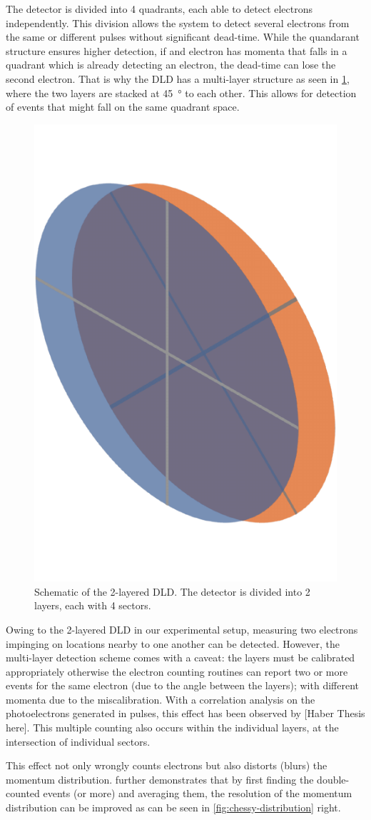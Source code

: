 The detector is divided into \num{4} quadrants, each able to detect electrons independently. This division allows the system to detect several electrons from the same or different pulses without significant dead-time. While the quandarant structure ensures higher detection, if and electron has momenta that falls in a quadrant which is already detecting an electron, the dead-time can lose the second electron. That is why the \gls{DLD} has a multi-layer structure as seen in \cref{fig:sectors}, where the two layers are stacked at \qty{45}{\degree} to each other. This allows for detection of events that might fall on the same quadrant space.

\begin{figure}[h]
    \centering
    \includegraphics[width=0.3\linewidth]{images/sectors_figure.pdf}
    \caption{Schematic of the 2-layered DLD. The detector is divided into 2 layers, each with 4 sectors.}
    \label{fig:sectors}
\end{figure}

Owing to the 2-layered \gls{DLD} in our experimental setup, measuring two electrons impinging on locations nearby to one another can be detected. However, the multi-layer detection scheme comes with a caveat: the layers must be calibrated appropriately otherwise the electron counting routines can report two or more events for the same electron (due to the angle between the layers); with different momenta due to the miscalibration. With a correlation analysis on the photoelectrons generated in pulses, this effect has been observed by [Haber Thesis here]. This multiple counting also occurs within the individual layers, at the intersection of individual sectors.

This effect not only wrongly counts electrons but also distorts (blurs) the momentum distribution. \citeauthor{heberStudiesUltrafastDynamics2024} further demonstrates that by first finding the double-counted events (or more) and averaging them, the resolution of the momentum distribution can be improved as can be seen in \cref{fig:chessy-distribution} right.

